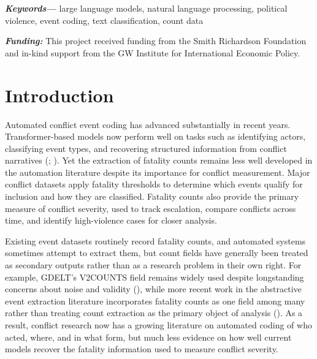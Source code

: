 \documentclass[
  11pt,
]{article}
\providecommand{\keywords}[1]{\textbf{\textit{Keywords---}}#1}
\providecommand{\fundinginfo}[1]{\textbf{\textit{Funding: }}#1}
\begin{document}
\vspace{\baselineskip}

\indent \keywords{%
large language models, natural language processing, political
violence, event coding, text classification, count data%
}


\vspace{0.25in}



\vspace{0.25in}


\noindent
\fundinginfo{This project received funding from the Smith Richardson
Foundation and in-kind support from the GW Institute for International
Economic Policy.}



\restoregeometry

\section{Introduction}\label{introduction}

Automated conflict event coding has advanced substantially in recent
years. Transformer-based models now perform well on tasks such as
identifying actors, classifying event types, and recovering structured
information from conflict narratives (; ). Yet the
extraction of fatality counts remains less well developed in the
automation literature despite its importance for conflict measurement.
Major conflict datasets apply fatality thresholds to determine which
events qualify for inclusion and how they are classified. Fatality
counts also provide the primary measure of conflict severity, used to
track escalation, compare conflicts across time, and identify
high-violence cases for closer analysis.

Existing event datasets routinely record fatality counts, and automated
systems sometimes attempt to extract them, but count fields have
generally been treated as secondary outputs rather than as a research
problem in their own right. For example, GDELT's V2COUNTS field remains
widely used despite longstanding concerns about noise and validity
(), while more
recent work in the abstractive event extraction literature incorporates
fatality counts as one field among many rather than treating count
extraction as the primary object of analysis
(). As a result, conflict
research now has a growing literature on automated coding of who acted,
where, and in what form, but much less evidence on how well current
models recover the fatality information used to measure conflict
severity.
\end{document}
